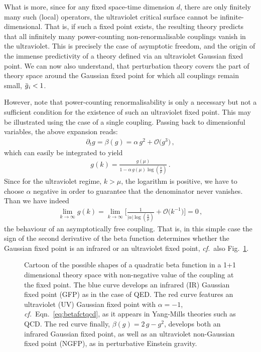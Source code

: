 \documentclass[11pt]{book}
\newcommand{\overbar}[1]{\mkern 1.5mu\overline{\mkern-1.5mu#1\mkern-1.5mu}\mkern 1.5mu}
\newcommand\cf{\textit{cf.}\ }
\numberwithin{equation}{chapter}
\begin{document}
What is more, since for any fixed space-time dimension $d$,
there are only finitely many such (local) operators,
the ultraviolet critical surface cannot be infinite-dimensional.
That is, if such a fixed point exists, the resulting theory predicts
that all infinitely many power-counting non-renormalisable couplings
vanish in the ultraviolet. This is precisely the case of asymptotic
freedom, and the origin of the immense predictivity of a theory
defined via an ultraviolet Gaussian fixed point.
We can now also understand, that perturbation theory covers
the part of theory space around the Gaussian fixed point
for which all couplings remain small, $\overbar g_i < 1$.

However, note that power-counting renormalisability is only a
necessary but not a sufficient condition for the existence of such an ultraviolet
fixed point. This may be illustrated using the case of a single
coupling. Passing back to dimensionful variables, the above expansion
reads:
\begin{align}
  \partial_t g =
  \beta(g) =
  \alpha \, g^2
  + \mathcal O \big( g^3 \big) \,,
  \label{eq:betafctqcd}
\end{align}
which can easily be integrated to yield
\begin{align}
  g(k) =
  \frac{
    g(\mu)
  }{
    1 - \alpha \, g(\mu) \log \left( \frac k{\mu} \right)
  } \,.
\end{align}
Since for the ultraviolet regime, $k>\mu$, the logarithm
is positive, we have to choose $\alpha$ negative
in order to guarantee that the denominator never
vanishes. Than we have indeed
\begin{align}
  \lim_{k \rightarrow \infty}
  g(k) =
  \lim_{k \rightarrow \infty}
  \Bigg[
    \frac{ 1 }{ | \alpha | \log \left( \frac k{\mu} \right) }
    + \mathcal O \big( k^{-1} \big)
  \Bigg]
  = 0 \,,
\end{align}
the behaviour of an asymptotically free coupling.
That is, in this simple case the sign of the second
derivative of the beta function determines whether
the Gaussian fixed point is an infrared or an ultraviolet
fixed point, \cf also Fig.~\ref{fig:shapesbetafunctions}.

\begin{figure}
  \begin{center}
    
  \end{center}
  \vspace*{-5mm}
  \caption{
    Cartoon of the possible shapes of a quadratic beta function
    in a 1+1 dimensional theory space with non-negative
    value of the coupling at the fixed point.
    The blue curve develops
    an infrared (IR) Gaussian fixed point (GFP) as in the case of QED.
    The red curve features an ultraviolet (UV) Gaussian fixed point
    with $\alpha = -1$, \cf Eqn.~\eqref{eq:betafctqcd}, as it
    appears in Yang-Mills theories such as QCD.
    The red curve finally, $\beta(g) = 2 \, g - g^2$, develops
    both an infrared Gaussian fixed point, as well as an
    ultraviolet non-Gaussian fixed point (NGFP),
    as in perturbative Einstein gravity.
  }
  \label{fig:shapesbetafunctions}
\end{figure}
\end{document}
